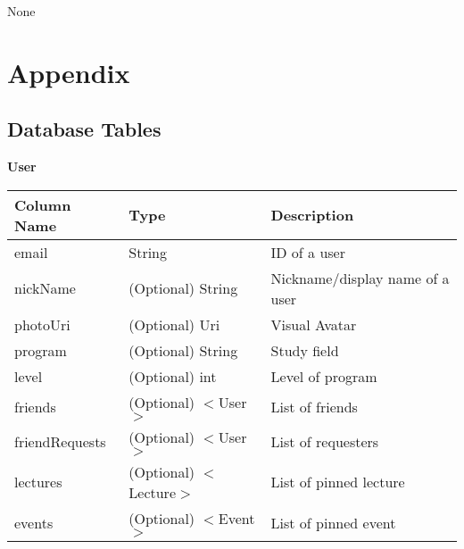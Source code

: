 \documentclass[12pt, titlepage]{article}
\begin{document}
\begin{itemize}
None

\newpage

\section{Appendix} \label{Appendix}
\subsection{Database Tables}

\quad \textbf{User}
\begin{table}[H]
	\begin{tabular}{|p{}|p{}|p{}|}
		\hline
		\textbf{Column Name} & \textbf{Type}  & \textbf{Description}                  \\
		\hline
		email                   & String                & ID of a user                        \\
		\hline
		nickName           & (Optional) String                & Nickname/display name of a user      \\
		\hline
		photoUri           & (Optional) Uri                & Visual Avatar       \\
		\hline
		program            & (Optional) String                & Study field                \\
		\hline
		level             & (Optional) int                & Level of program                 \\
		\hline
		friends          &  (Optional) $<$User$>$                & List of friends \\
		\hline
		friendRequests          &  (Optional) $<$User$>$                & List of requesters              \\
		\hline
		lectures                & (Optional) $<$Lecture$>$                & List of pinned lecture                     \\
		\hline
		events                & (Optional) $<$Event$>$                & List of pinned event                     \\			
		\hline
\end{tabular}
\end{table}


\end{itemize}
\end{document}
